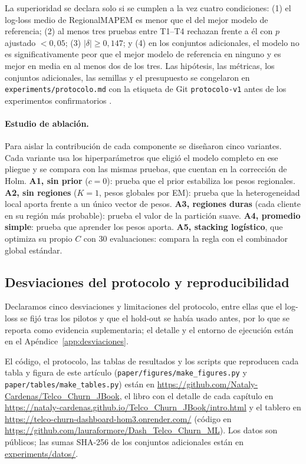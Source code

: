 \documentclass[11pt,a4paper]{article}
\begin{document}
La superioridad se declara solo si se cumplen a la vez cuatro condiciones: (1) el log-loss medio de RegionalMAPEM es menor que el del mejor modelo de referencia; (2) al menos tres pruebas entre T1--T4 rechazan frente a él con $p$ ajustado $<0{,}05$; (3) $|\delta|\ge0{,}147$; y (4) en los conjuntos adicionales, el modelo no es significativamente peor que el mejor modelo de referencia en ninguno y es mejor en media en al menos dos de los tres. Las hipótesis, las métricas, los conjuntos adicionales, las semillas y el presupuesto se congelaron en \texttt{experiments/protocolo.md} con la etiqueta de Git \texttt{protocolo-v1} antes de los experimentos confirmatorios \cite{nosek2018}.

\paragraph{Estudio de ablación.}\label{sec:ablacion} Para aislar la contribución de cada componente se diseñaron cinco variantes. Cada variante usa los hiperparámetros que eligió el modelo completo en ese pliegue y se compara con las mismas pruebas, que cuentan en la corrección de Holm. \textbf{A1, sin prior} ($c=0$): prueba que el prior estabiliza los pesos regionales. \textbf{A2, sin regiones} ($K=1$, pesos globales por EM): prueba que la heterogeneidad local aporta frente a un único vector de pesos. \textbf{A3, regiones duras} (cada cliente en su región más probable): prueba el valor de la partición suave. \textbf{A4, promedio simple}: prueba que aprender los pesos aporta. \textbf{A5, stacking logístico}, que optimiza su propio $C$ con 30 evaluaciones: compara la regla con el combinador global estándar.

\subsection{Desviaciones del protocolo y reproducibilidad}\label{sec:desviaciones}
Declaramos cinco desviaciones y limitaciones del protocolo, entre ellas que el log-loss se fijó tras los pilotos y que el hold-out se había usado antes, por lo que se reporta como evidencia suplementaria; el detalle y el entorno de ejecución están en el Apéndice~\ref{app:desviaciones}.

El código, el protocolo, las tablas de resultados y los scripts que reproducen cada tabla y figura de este artículo (\texttt{paper/figures/make\_figures.py} y \texttt{paper/tables/make\_tables.py}) están en \url{https://github.com/Nataly-Cardenas/Telco_Churn_JBook}, el libro con el detalle de cada capítulo en \url{https://nataly-cardenas.github.io/Telco_Churn_JBook/intro.html} y el tablero en \url{https://telco-churn-dashboard-hom3.onrender.com/} (código en \url{https://github.com/lauraformore/Dash_Telco_Churn_ML}). Los datos son públicos; las sumas SHA-256 de los conjuntos adicionales están en \url{experiments/datos/}.
\end{document}
